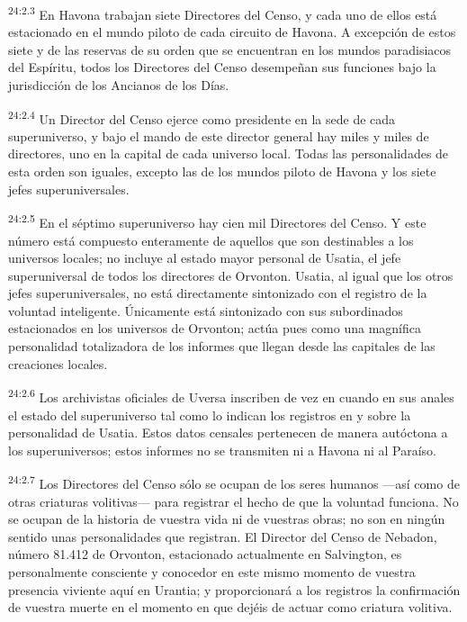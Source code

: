 \par
\textsuperscript{24:2.3} En Havona trabajan siete Directores del Censo, y cada uno de ellos está estacionado en el mundo piloto de cada circuito de Havona. A excepción de estos siete y de las reservas de su orden que se encuentran en los mundos paradisiacos del Espíritu, todos los Directores del Censo desempeñan sus funciones bajo la jurisdicción de los Ancianos de los Días.

\par
\textsuperscript{24:2.4} Un Director del Censo ejerce como presidente en la sede de cada superuniverso, y bajo el mando de este director general hay miles y miles de directores, uno en la capital de cada universo local. Todas las personalidades de esta orden son iguales, excepto las de los mundos piloto de Havona y los siete jefes superuniversales.

\par
\textsuperscript{24:2.5} En el séptimo superuniverso hay cien mil Directores del Censo. Y este número está compuesto enteramente de aquellos que son destinables a los universos locales; no incluye al estado mayor personal de Usatia, el jefe superuniversal de todos los directores de Orvonton. Usatia, al igual que los otros jefes superuniversales, no está directamente sintonizado con el registro de la voluntad inteligente. Únicamente está sintonizado con sus subordinados estacionados en los universos de Orvonton; actúa pues como una magnífica personalidad totalizadora de los informes que llegan desde las capitales de las creaciones locales.

\par
\textsuperscript{24:2.6} Los archivistas oficiales de Uversa inscriben de vez en cuando en sus anales el estado del superuniverso tal como lo indican los registros en y sobre la personalidad de Usatia. Estos datos censales pertenecen de manera autóctona a los superuniversos; estos informes no se transmiten ni a Havona ni al Paraíso.

\par
\textsuperscript{24:2.7} Los Directores del Censo sólo se ocupan de los seres humanos ---así como de otras criaturas volitivas--- para registrar el hecho de que la voluntad funciona. No se ocupan de la historia de vuestra vida ni de vuestras obras; no son en ningún sentido unas personalidades que registran. El Director del Censo de Nebadon, número 81.412 de Orvonton, estacionado actualmente en Salvington, es personalmente consciente y conocedor en este mismo momento de vuestra presencia viviente aquí en Urantia; y proporcionará a los registros la confirmación de vuestra muerte en el momento en que dejéis de actuar como criatura volitiva.

